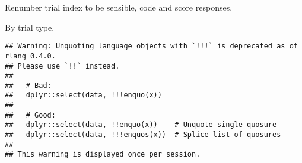 \documentclass[]{article}
\newenvironment{Shaded}{\begin{snugshade}}{\end{snugshade}}
\newcommand{\KeywordTok}[1]{\textcolor[rgb]{0.13,0.29,0.53}{\textbf{{#1}}}}
\newcommand{\DataTypeTok}[1]{\textcolor[rgb]{0.13,0.29,0.53}{{#1}}}
\newcommand{\DecValTok}[1]{\textcolor[rgb]{0.00,0.00,0.81}{{#1}}}
\newcommand{\StringTok}[1]{\textcolor[rgb]{0.31,0.60,0.02}{{#1}}}
\newcommand{\CommentTok}[1]{\textcolor[rgb]{0.56,0.35,0.01}{\textit{{#1}}}}
\newcommand{\NormalTok}[1]{{#1}}
\begin{document}
Renumber trial index to be sensible, code and score responses.

\begin{Shaded}
\end{Shaded}

By trial type.

\begin{Shaded}
\end{Shaded}

\begin{verbatim}
## Warning: Unquoting language objects with `!!!` is deprecated as of rlang 0.4.0.
## Please use `!!` instead.
## 
##   # Bad:
##   dplyr::select(data, !!!enquo(x))
## 
##   # Good:
##   dplyr::select(data, !!enquo(x))    # Unquote single quosure
##   dplyr::select(data, !!!enquos(x))  # Splice list of quosures
## 
## This warning is displayed once per session.
\end{verbatim}
\end{document}

